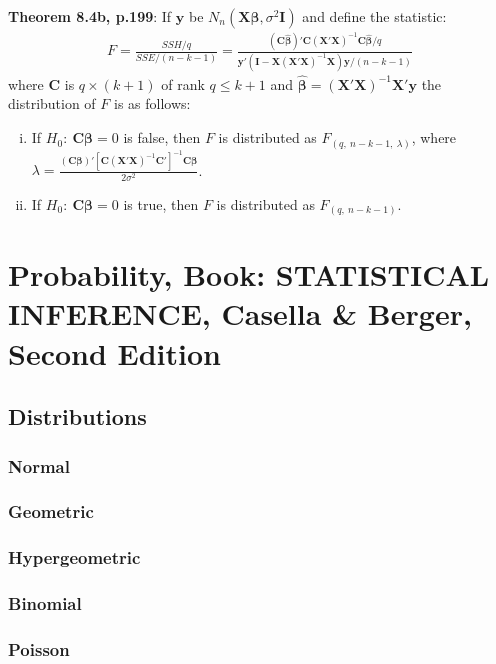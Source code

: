 \documentclass[]{article}
\begin{document}
\textbf{Theorem 8.4b, p.199}: If $\pmb{y}$ be $N_n(\pmb{X}\pmb{\beta}, \sigma^2\pmb{I})$ and define the statistic:
$$
\begin{aligned}
	F = \frac{SSH/q}{SSE/(n-k-1)} = \frac{(\pmb{C}\hat{\pmb{\beta}})' \pmb{C}(\pmb{X}'\pmb{X})^{-1} \pmb{C}\hat{\pmb{\beta}}/q}{\pmb{y}'(\pmb{I}- \pmb{X}(\pmb{X}'\pmb{X})^{-1}\pmb{X})\pmb{y}/(n-k-1)}
\end{aligned}
$$
where $\pmb{C}$ is $q\times (k+1)$ of rank $q \leq k+1$ and $\hat{\pmb{\beta}} = (\pmb{X}'\pmb{X})^{-1}\pmb{X}'\pmb{y}$ the distribution of $F$ is as follows:
\begin{enumerate}[(i)]
	\item If $H_0:~\pmb{C}\pmb{\beta}=0$ is false, then $F$ is distributed as $F_{(q,~n-k-1,~\lambda)}$, where $\lambda=\frac{(\pmb{C}\pmb{\beta})'[\pmb{C}(\pmb{X}'\pmb{X})^{-1}\pmb{C}']^{-1}\pmb{C}\pmb{\beta}}{2\sigma^2}$.
	\item If $H_0:~\pmb{C}\pmb{\beta}=0$ is true, then $F$ is distributed as $F_{(q,~n-k-1)}$.
\end{enumerate}

\clearpage


\section{Probability, \textbf{Book: STATISTICAL INFERENCE, Casella \& Berger, Second Edition }}
\subsection{Distributions}
\subsubsection{Normal}
\subsubsection{Geometric}
\subsubsection{Hypergeometric}
\subsubsection{Binomial}
\subsubsection{Poisson}
\end{document}
